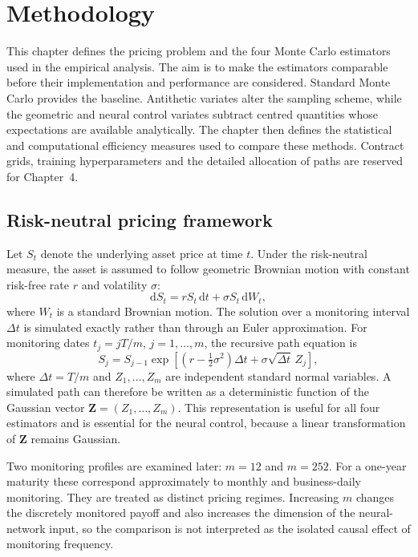 \chapter{Methodology}
\label{chap:methodology}

This chapter defines the pricing problem and the four Monte Carlo estimators used in the empirical analysis. The aim is to make the estimators comparable before their implementation and performance are considered. Standard Monte Carlo provides the baseline. Antithetic variates alter the sampling scheme, while the geometric and neural control variates subtract centred quantities whose expectations are available analytically. The chapter then defines the statistical and computational efficiency measures used to compare these methods. Contract grids, training hyperparameters and the detailed allocation of paths are reserved for Chapter~4.

\section{Risk-neutral pricing framework}

Let $S_t$ denote the underlying asset price at time $t$. Under the risk-neutral measure, the asset is assumed to follow geometric Brownian motion with constant risk-free rate $r$ and volatility $\sigma$:
\begin{equation}
\mathrm{d}S_t = rS_t\,\mathrm{d}t + \sigma S_t\,\mathrm{d}W_t,
\label{eq:gbm_sde}
\end{equation}
where $W_t$ is a standard Brownian motion. The solution over a monitoring interval $\Delta t$ is simulated exactly rather than through an Euler approximation. For monitoring dates $t_j = jT/m$, $j = 1, \ldots, m$, the recursive path equation is
\begin{equation}
S_j = S_{j-1} \exp\left[\left(r - \tfrac{1}{2}\sigma^2\right)\Delta t + \sigma\sqrt{\Delta t}\,Z_j\right],
\label{eq:gbm_discrete}
\end{equation}
where $\Delta t = T/m$ and $Z_1, \ldots, Z_m$ are independent standard normal variables. A simulated path can therefore be written as a deterministic function of the Gaussian vector $\mathbf{Z} = (Z_1, \ldots, Z_m)$. This representation is useful for all four estimators and is essential for the neural control, because a linear transformation of $\mathbf{Z}$ remains Gaussian.

Two monitoring profiles are examined later: $m = 12$ and $m = 252$. For a one-year maturity these correspond approximately to monthly and business-daily monitoring. They are treated as distinct pricing regimes. Increasing $m$ changes the discretely monitored payoff and also increases the dimension of the neural-network input, so the comparison is not interpreted as the isolated causal effect of monitoring frequency.

